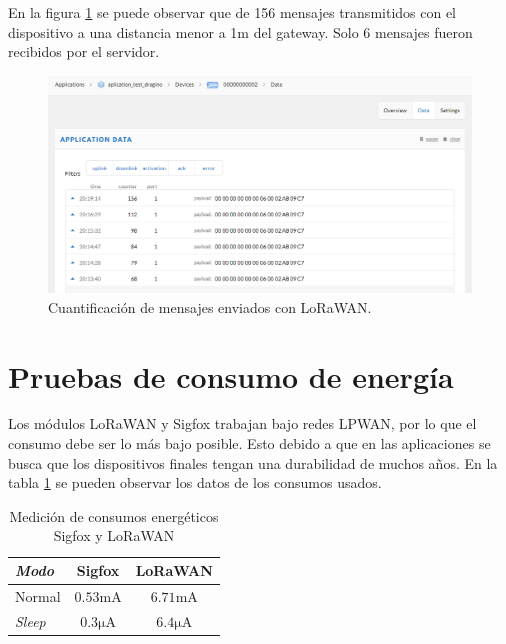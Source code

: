 En la figura \ref{fig:LoraTX_corto} se puede observar que de 156 mensajes transmitidos con el dispositivo a una distancia menor a 1m del gateway. Solo 6 mensajes fueron recibidos por el servidor.
\begin{figure}[H]
	\centering
	\includegraphics[scale=.5]{./Figures/LoraTX_corto.PNG}
	\caption{Cuantificación de mensajes enviados con LoRaWAN.}
	\label{fig:LoraTX_corto}
\end{figure}

\section{Pruebas de consumo de energía}
Los módulos LoRaWAN y Sigfox trabajan bajo redes LPWAN, por lo que el consumo debe ser lo más bajo posible. Esto debido a que en las aplicaciones se busca que los dispositivos finales tengan una durabilidad de muchos años. En la tabla \ref{tab:ConsumosTabla} se pueden observar los datos de los consumos usados.

\begin{table}[h]
	\centering
	\caption[Consumos]{Medición de consumos energéticos Sigfox y LoRaWAN }
	\begin{tabular}{l c c}    
		\toprule
		\textbf{ \textit{Modo} } & \textbf{Sigfox} & \textbf{LoRaWAN} \\
		\midrule
		Normal	    &$\mathrm{0.53 mA}$ 	&$\mathrm{6.71 mA}$  \\	
		\textit{Sleep}	            & $\mathrm{0.3 \mu{A}}$     & $\mathrm{6.4 \mu{A}}$\\
		\bottomrule
		\hline
	\end{tabular}
	\label{tab:ConsumosTabla}
\end{table}


